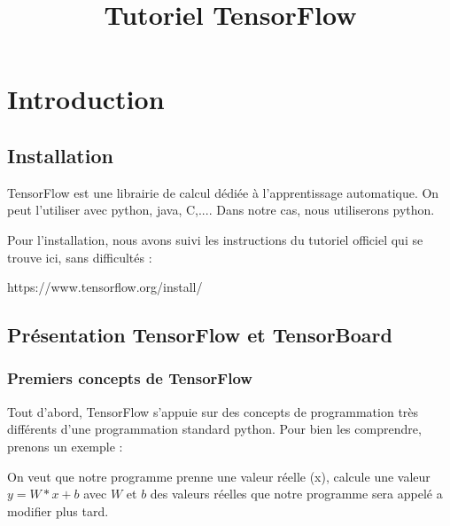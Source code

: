 \documentclass[a4paper,11pt]{book}
\theoremstyle{theo}
\begin{document}
\let\cleardoublepage\clearpage
\title{  Tutoriel TensorFlow}





\maketitle

\newpage

\tableofcontents
\newpage
\chapter{Introduction }

\section{Installation}
TensorFlow est une librairie de calcul dédiée à l'apprentissage automatique. On peut l'utiliser avec python, java, C,.... Dans notre cas, nous utiliserons python.


Pour l'installation, nous avons suivi les instructions du tutoriel officiel qui se trouve ici, sans difficultés :

https://www.tensorflow.org/install/


\section{Présentation TensorFlow et TensorBoard}

\subsection{Premiers concepts de TensorFlow}

Tout d'abord, TensorFlow s'appuie sur des concepts de programmation très différents d'une programmation standard python. Pour bien les comprendre, prenons un exemple :


On veut que notre programme prenne une valeur réelle (x), calcule une valeur  $y = W*x+b$ avec $W$ et $b$ des valeurs réelles que notre programme sera appelé a modifier plus tard.
\end{document}
